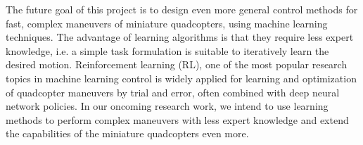 The future goal of this project is to design even more general control methods for fast, complex maneuvers of miniature quadcopters, using machine learning techniques. The advantage of learning algorithms is that they require less expert knowledge, i.e. a simple task formulation is suitable to iteratively learn the desired motion. Reinforcement learning (RL), one of the most popular research topics in machine learning control is widely applied for learning and optimization of quadcopter maneuvers by trial and error, often combined with deep neural network policies. In our oncoming research work, we intend to use learning methods to perform complex maneuvers with less expert knowledge and extend the capabilities of the miniature quadcopters even more.





